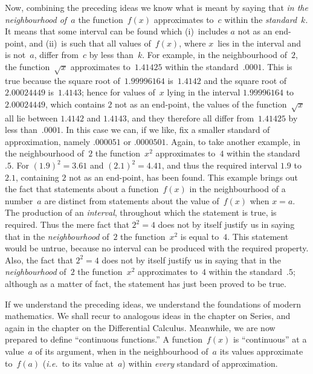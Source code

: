 \documentclass[12pt,leqno]{book}[2005/09/16]
\newcommand{\PageSep}[1]{\ignorespaces}
\newcommand{\ie}{\emph{i.e.}}
\begin{document}
Now, combining the preceding ideas we
know what is meant by saying that \emph{in the
neighbourhood of~$a$} the function~$f(x)$ approximates
to~$c$ within the \emph{standard}~$k$. It means
that some interval can be found which (i)~includes
$a$ not as an end-point, and (ii)~is such
that all values of~$f(x)$, where $x$~lies in the interval
and is not~$a$, differ from~$c$ by less than~$k$. For
example, in the neighbourhood of~$2$, the function~$\sqrt{x}$
approximates to~$1.41425$ within the
standard~$.0001$. This is true because the
square root of~$1.99996164$ is~$1.4142$ and the
square root of~$2.00024449$ is~$1.4143$; hence
for values of~$x$ lying in the interval
$1.99996164$ to~$2.00024449$, which contains $2$
not as an end-point, the values of the function~$\sqrt{x}$
all lie between $1.4142$ and $1.4143$, and
\PageSep{161}
they therefore all differ from~$1.41425$ by less
than~$.0001$. In this case we can, if we like,
fix a smaller standard of approximation,
namely $.000051$ or $.0000501$. Again, to take
another example, in the neighbourhood of~$2$
the function~$x^{2}$ approximates to~$4$ within the
standard~$.5$. For $(1.9)^{2} = 3.61$ and $(2.1)^{2} = 4.41$,
and thus the required interval $1.9$ to~$2.1$,
containing $2$ not as an end-point, has
been found. This example brings out the
fact that statements about a function~$f(x)$ in
the neighbourhood of a number~$a$ are distinct
from statements about the value of~$f(x)$ when
$x = a$. The production of an \emph{interval}, throughout
which the statement is true, is required.
Thus the mere fact that $2^{2} = 4$ does not by
itself justify us in saying that in the \emph{neighbourhood}
of~$2$ the function~$x^{2}$ is equal to~$4$.
This statement would be untrue, because no
interval can be produced with the required
property. Also, the fact that $2^{2} = 4$ does not
by itself justify us in saying that in the
\emph{neighbourhood} of~$2$ the function~$x^{2}$ approximates
to~$4$ within the standard~$.5$; although
as a matter of fact, the statement has just
been proved to be true.

If we understand the preceding ideas, we
understand the foundations of modern
mathematics. We shall recur to analogous
ideas in the chapter on Series, and again
in the chapter on the Differential Calculus.
\PageSep{162}
%
Meanwhile, we are now prepared to define
``continuous functions.'' A function~$f(x)$
is ``continuous'' at a value~$a$ of its argument,
when in the neighbourhood of~$a$
its values approximate to~$f(a)$ (\ie~to its
value at~$a$) within \emph{every} standard of approximation.
\end{document}
